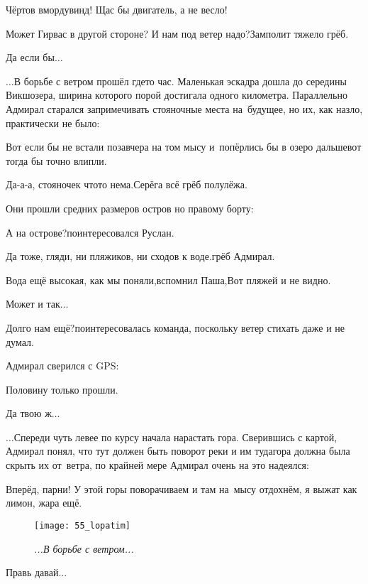 \diagdash Чёртов вмордувинд! Щас бы двигатель, а не весло!

\diagdash Может Гирвас в другой стороне? И нам под ветер надо?\mdash Замполит тяжело грёб.

\diagdash Да если бы$\ldots$

\vspace{0.75em}
$\ldots$В борьбе с ветром прошёл где\sdash то час. Маленькая эскадра дошла до середины Викшозера, ширина которого порой достигала одного километра. Параллельно Адмирал старался запримечивать стояночные места на~будущее, но их, как назло, практически не было:

\diagdash Вот если бы не встали позавчера на том мысу и~попёрлись бы в озеро дальше\mdash вот тогда бы точно влипли.

\diagdash Да-а-а, стояночек что\sdash то нема.\mdash Серёга всё грёб полулёжа.

Они прошли средних размеров остров но правому борту:

\diagdash А на острове?\mdash поинтересовался Руслан.

\diagdash Да тоже, гляди, ни пляжиков, ни сходов к воде.\mdash грёб Адмирал.

\diagdash Вода ещё высокая, как мы поняли,\mdash вспомнил Паша,\mdash Вот пляжей и не видно.

\diagdash Может и так$\ldots$

\diagdash Долго нам ещё?\mdash поинтересовалась команда, поскольку ветер стихать даже и не думал.

Адмирал сверился с GPS:

\diagdash Половину только прошли.

\diagdash Да твою ж$\ldots$

\vspace{1em}
$\ldots$Спереди чуть левее по курсу начала нарастать гора. Сверившись с картой, Адмирал понял, что тут должен быть поворот реки и им туда\mdash гора должна была скрыть их от~ветра, по крайней мере Адмирал очень на это надеялся:

\diagdash Вперёд, парни! У этой горы поворачиваем и там на~мысу отдохнём, я выжат как лимон, жара ещё.

\begin{wrapfigure}[15]{l}{0.58\textwidth}
	\centering
	\texttt{[image: 55\_lopatim]}
	\caption{\small\textit{...В борьбе с ветром...}}
\end{wrapfigure}
\diagdash Правь давай$\ldots$

